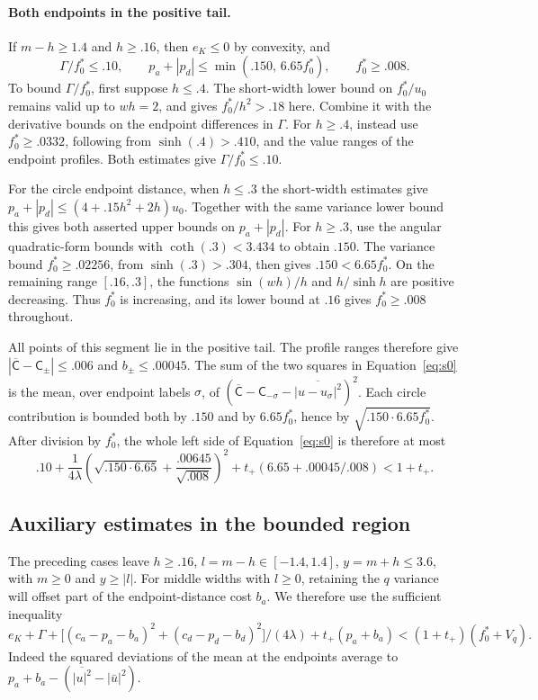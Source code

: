 \paragraph{Both endpoints in the positive tail.}
If $m-h\ge1.4$ and $h\ge.16$, then \(e_K\le0\) by convexity, and
\[
 \Gamma/f_0^*\le .10,\qquad
 p_a+|p_d|\le \min(.150,\,6.65 f_0^*),\qquad f_0^*\ge.008 .
\]
To bound $\Gamma/f_0^*$, first suppose $h\le.4$.
The short-width lower bound on $f_0^*/u_0$ remains valid up to
$wh=2$, and gives $f_0^*/h^2>.18$ here. Combine it with the
derivative bounds on the endpoint differences in $\Gamma$.
For $h\ge.4$, instead use $f_0^*\ge.0332$, following from
$\sinh(.4)>.410$, and the value ranges of the endpoint profiles.
Both estimates give $\Gamma/f_0^*\le.10$.

For the circle endpoint distance, when $h\le.3$ the short-width
estimates give $p_a+|p_d|\le(4+.15h^2+2h)u_0$.
Together with the same variance lower bound this gives both asserted
upper bounds on $p_a+|p_d|$. For $h\ge.3$, use the angular
quadratic-form bounds with $\coth(.3)<3.434$ to obtain $.150$.
The variance bound $f_0^*\ge.02256$, from $\sinh(.3)>.304$,
then gives $.150<6.65f_0^*$.
On the remaining range $[.16,.3]$, the functions $\sin(wh)/h$
and $h/\sinh h$ are positive decreasing. Thus $f_0^*$ is increasing,
and its lower bound at $.16$ gives $f_0^*\ge.008$ throughout.

All points of this segment lie in the positive tail. The profile
ranges therefore give $|\overline{\mathsf C}-\mathsf C_\pm|\le.006$
and $b_\pm\le.00045$.
The sum of the two squares in Equation~\eqref{eq:s0} is the mean,
over endpoint labels $\sigma$, of
$(\overline{\mathsf C}-\mathsf C_{-\sigma}
-\overline{|u-u_\sigma|^2})^2$.
Each circle contribution is bounded both by $.150$ and by
$6.65f_0^*$, hence by $\sqrt{.150\cdot6.65f_0^*}$.
After division by $f_0^*$, the whole left side of
Equation~\eqref{eq:s0} is therefore at most
\[
 .10+\frac1{4\lambda}\left(\sqrt{.150\cdot6.65}+\frac{.00645}{\sqrt{.008}}\right)^2+
 t_+(6.65+.00045/.008)<1+t_+ .
\]

\subsection{Auxiliary estimates in the bounded region}
\label{subsec:segments-auxiliary}

The preceding cases leave \(h\ge .16\), \(l=m-h\in[-1.4,1.4]\), \(y=m+h\le3.6\), with $m\ge0$ and $y\ge|l|$.
For middle widths with $l\ge0$, retaining the $q$ variance will offset
part of the endpoint-distance cost $b_a$. We therefore use the sufficient
inequality
\[
 e_K+\Gamma+\big[(c_a-p_a-b_a)^2+(c_d-p_d-b_d)^2\big]/(4\lambda)+t_+(p_a+b_a)
     < (1+t_+)(f_0^*+V_q).                                                   \tag{sv}\label{eq:sv}
\]
Indeed the squared deviations of the mean at the endpoints average to \(p_a+b_a-(\overline{|u|^2}-|\bar u|^2)\).

